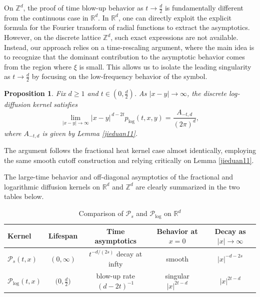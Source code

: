 \documentclass[reqno,12pt]{amsart}
\numberwithin{equation}{section}
\newtheorem{proposition}[theorem]{Proposition}
\begin{document}
	On \(\mathbb{Z}^d\), the proof of time blow-up behavior as \(t \to \frac{d}{2}\) is fundamentally different from the continuous case in \(\mathbb{R}^d\). In \(\mathbb{R}^d\), one can directly exploit the explicit formula for the Fourier transform of radial functions to extract the asymptotics. However, on the discrete lattice \(\mathbb{Z}^d\), such exact expressions are not available. Instead, our approach relies on a time-rescaling argument, where the main idea is to recognize that the dominant contribution to the asymptotic behavior comes from the region where \(\xi\) is small. This allows us to isolate the leading singularity as \(t \to \frac{d}{2}\) by focusing on the low-frequency behavior of the symbol.

\begin{proposition}\label{prop:log_offdiag_asym11}
	Fix \(d\ge1\) and \(t\in(0,\tfrac d2)\).  As \(\lvert x-y\rvert\to\infty\), the discrete log‐diffusion kernel satisfies
	\[
	\lim\limits_{\lvert x-y\rvert\rightarrow \infty}\lvert x-y\rvert^{\,d-2t}p_{\log}(t,x,y)=\frac{A_{-t,d}}{\left(2\pi\right)^d},
	\]
		where $A_{-t,d}$ is given by Lemma \ref{jieduan11}.
\end{proposition}


 The argument follows the fractional heat kernel case almost identically, employing the same smooth cutoff construction and relying critically on Lemma \ref{jieduan11}.

The large-time behavior and off-diagonal asymptotics of the fractional and logarithmic diffusion kernels on $\mathbb{R}^d$ and $\mathbb{Z}^d$ are clearly summarized in the two tables below.



\begin{table}[ht]
	\centering
	\caption{Comparison of \(\mathcal{P}_s\) and \(\mathcal{P}_{\log}\) on \(\mathbb{R}^d\)}
	\label{tab:Rn-kernels}
	\begin{tabular}{lcccc}
		\toprule
		Kernel & Lifespan & Time asymptotics & Behavior at \(x=0\) & Decay as \(\lvert x\rvert\to\infty\) \\
		\midrule
		\(\mathcal{P}_s(t,x)\)        & \((0,\infty)\)              & \(t^{-d/(2s)}\) decay at infty      & smooth        & \(\lvert x\rvert^{-d-2s}\)   \\
		\(\mathcal{P}_{\log}(t,x)\)    & \(\bigl(0,\tfrac d2\bigr)\) & blow-up rate \((d-2t)^{-1}\) & singular  $|x|^{2t-d} $   & \(\lvert x\rvert^{2t-d}\)    \\
		\bottomrule
	\end{tabular}
\end{table}
\end{document}
